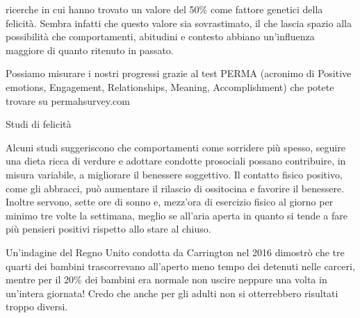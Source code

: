 \documentclass[12pt]{book} %
\begin{document}
ricerche in cui hanno trovato un valore del 50\% come fattore genetici della felicità. Sembra infatti che questo valore
sia sovrastimato, il che lascia spazio alla possibilità che comportamenti, abitudini e contesto abbiano un’influenza maggiore di quanto ritenuto in passato.

Possiamo misurare i nostri progressi grazie al test PERMA (acronimo di Positive emotions, Engagement, Relationships,
Meaning, Accomplishment) che potete trovare su permahsurvey.com 


\bigskip
\begin{mdframed}[linewidth=1pt]
Studi di felicità 

Alcuni studi suggeriscono che comportamenti come sorridere più spesso, seguire una dieta ricca di verdure e adottare condotte prosociali possano contribuire, in misura variabile, a migliorare il benessere soggettivo. Il contatto fisico positivo, come gli abbracci, può aumentare il rilascio di ossitocina e favorire il benessere. Inoltre servono, sette ore di
sonno e, mezz'ora di esercizio fisico al giorno per minimo tre volte la settimana, meglio se
all'aria aperta in quanto si tende a fare più pensieri positivi rispetto allo stare al
chiuso.

Un'indagine del Regno Unito condotta da Carrington nel 2016 dimostrò che tre quarti dei bambini
trascorrevano all'aperto meno tempo dei detenuti nelle carceri, mentre per il 20\% dei bambini era
normale non uscire neppure una volta in un'intera giornata! Credo che anche per gli adulti non si
otterrebbero risultati troppo diversi.


\end{mdframed}
\end{document}
